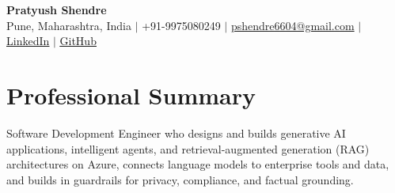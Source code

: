 \documentclass[a4paper,11pt]{article}
\begin{document}
\begin{center}
  {\Large\bfseries Pratyush Shendre}\\[2pt]
  \small Pune, Maharashtra, India $|$ +91-9975080249 $|$
  \href{mailto:pshendre6604@gmail.com}{pshendre6604@gmail.com} $|$
  \href{https://www.linkedin.com/in/pratyush-shendre-2256a7223/}{\underline{LinkedIn}} $|$
  \href{https://github.com/PratyushS04}{\underline{GitHub}}
\end{center}

\section{Professional Summary}
\small Software Development Engineer who designs and builds generative AI applications, intelligent agents, and retrieval-augmented generation (RAG) architectures on Azure, connects language models to enterprise tools and data, and builds in guardrails for privacy, compliance, and factual grounding.
\end{document}
